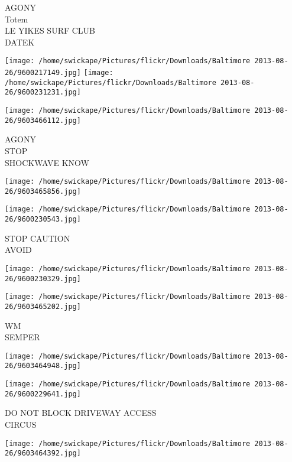 \documentclass[10pt,letterpaper]{article}
\begin{document}
AGONY\\
Totem\\
LE YIKES SURF CLUB\\
DATEK\\
\pagebreak

\texttt{[image: /home/swickape/Pictures/flickr/Downloads/Baltimore 2013-08-26/9600217149.jpg]}
\texttt{[image: /home/swickape/Pictures/flickr/Downloads/Baltimore 2013-08-26/9600231231.jpg]}

\vspace{0.25in}
\texttt{[image: /home/swickape/Pictures/flickr/Downloads/Baltimore 2013-08-26/9603466112.jpg]}

AGONY\\
STOP\\
SHOCKWAVE KNOW\\
\pagebreak

\texttt{[image: /home/swickape/Pictures/flickr/Downloads/Baltimore 2013-08-26/9603465856.jpg]}

\vspace{0.25in}
\texttt{[image: /home/swickape/Pictures/flickr/Downloads/Baltimore 2013-08-26/9600230543.jpg]}

STOP CAUTION\\
AVOID\\
\pagebreak

\texttt{[image: /home/swickape/Pictures/flickr/Downloads/Baltimore 2013-08-26/9600230329.jpg]}

\vspace{0.25in}
\texttt{[image: /home/swickape/Pictures/flickr/Downloads/Baltimore 2013-08-26/9603465202.jpg]}

WM\\
SEMPER\\
\pagebreak

\texttt{[image: /home/swickape/Pictures/flickr/Downloads/Baltimore 2013-08-26/9603464948.jpg]}

\vspace{0.25in}
\texttt{[image: /home/swickape/Pictures/flickr/Downloads/Baltimore 2013-08-26/9600229641.jpg]}

DO NOT BLOCK DRIVEWAY ACCESS\\
CIRCUS\\
\pagebreak

\texttt{[image: /home/swickape/Pictures/flickr/Downloads/Baltimore 2013-08-26/9603464392.jpg]}
\end{document}
